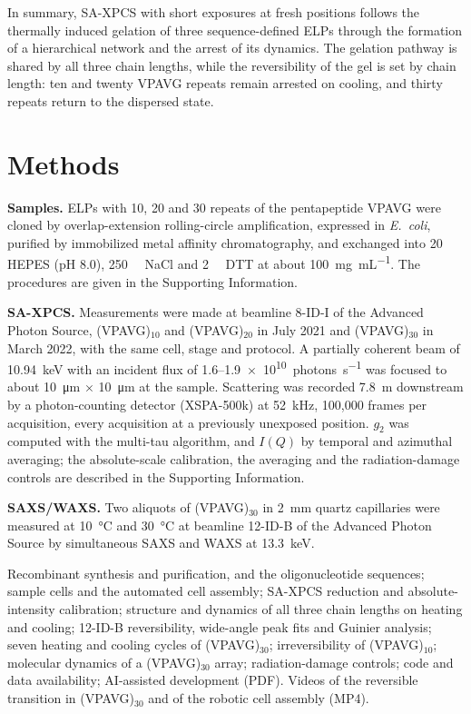 \documentclass[journal=nalefd,manuscript=letter,layout=traditional]{achemso}
\newcommand{\VP}[1]{(VPAVG)$_{#1}$}
\begin{document}
In summary, SA-XPCS with short exposures at fresh positions follows the thermally induced gelation of three sequence-defined ELPs through the formation of a hierarchical network and the arrest of its dynamics. The gelation pathway is shared by all three chain lengths, while the reversibility of the gel is set by chain length: ten and twenty VPAVG repeats remain arrested on cooling, and thirty repeats return to the dispersed state.

\section*{Methods}

\textbf{Samples.} ELPs with 10, 20 and 30 repeats of the pentapeptide VPAVG were cloned by overlap-extension rolling-circle amplification,\cite{Amiram2011-la} expressed in \textit{E.~coli}, purified by immobilized metal affinity chromatography, and exchanged into \SI{20}{\milli\Molar} HEPES (pH 8.0), \SI{250}{\milli\Molar} NaCl and \SI{2}{\milli\Molar} DTT at about \SI{100}{\milli\gram\per\milli\liter}. The procedures are given in the Supporting Information.

\textbf{SA-XPCS.} Measurements were made at beamline 8-ID-I of the Advanced Photon Source, \VP{10} and \VP{20} in July 2021 and \VP{30} in March 2022, with the same cell, stage and protocol. A partially coherent beam of \SI{10.94}{\kilo\electronvolt} with an incident flux of 1.6--\SI{1.9e10}{photons\per\second} was focused to about \SI{10}{\micro\meter} $\times$ \SI{10}{\micro\meter} at the sample. Scattering was recorded \SI{7.8}{\meter} downstream by a photon-counting detector (XSPA-500k)\cite{Nakaye2021-oc} at \SI{52}{\kilo\hertz}, 100{,}000 frames per acquisition, every acquisition at a previously unexposed position. $g_2$ was computed with the multi-tau algorithm, and $I(Q)$ by temporal and azimuthal averaging; the absolute-scale calibration, the averaging and the radiation-damage controls are described in the Supporting Information.

\textbf{SAXS/WAXS.} Two aliquots of \VP{30} in \SI{2}{\milli\meter} quartz capillaries were measured at \SI{10}{\degreeCelsius} and \SI{30}{\degreeCelsius} at beamline 12-ID-B of the Advanced Photon Source by simultaneous SAXS and WAXS at \SI{13.3}{\kilo\electronvolt}.\cite{APS12IDB,Xu2022-12IDB,Zheng2022-12IDB}

\begin{suppinfo}
Recombinant synthesis and purification, and the oligonucleotide sequences;
sample cells and the automated cell assembly; SA-XPCS reduction and
absolute-intensity calibration; structure and dynamics of all three chain
lengths on heating and cooling; 12-ID-B reversibility, wide-angle peak fits
and Guinier analysis; seven heating and cooling cycles of \VP{30};
irreversibility of \VP{10}; molecular dynamics of a \VP{30} array;
radiation-damage controls; code and data availability; AI-assisted
development (PDF). Videos of the reversible transition in \VP{30} and of the
robotic cell assembly (MP4).
\end{suppinfo}
\end{document}

